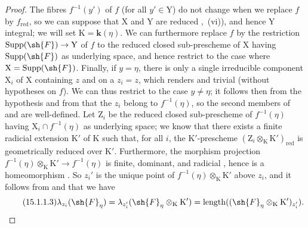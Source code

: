 \begin{proof}
\label{IV.15.1.1-proof}
The fibres $f^{-1}(y')$ of $f$ (for all $y'\in\mathrm{Y}$) do not change when we replace $f$ by $f_\mathrm{red}$, so we can suppose that $\mathrm{X}$ and $\mathrm{Y}$ are reduced ,~(vi)), and hence $\mathrm{Y}$ integral; we will set $\mathrm{K}=\mathbf{k}(\eta)$.
We can furthermore replace $f$ by the restriction $\operatorname{Supp}(\sh{F})\to\mathrm{Y}$ of $f$ to the reduced closed sub-prescheme of $\mathrm{X}$ having $\operatorname{Supp}(\sh{F})$ as underlying space, and hence restrict to the case where $\mathrm{X}=\operatorname{Supp}(\sh{F})$.
Finally, if $y=\eta$, there is only a single irreducible component $\mathrm{X}_i$ of $\mathrm{X}$ containing $z$  and on a $z_i=z$, which renders  and  trivial (without hypotheses on $f$).
We can thus restrict to the case $y\neq\eta$; it follows then from the hypothesis and from  that the $z_i$ belong to $f^{-1}(\eta)$, so the second members of  and  are well-defined.
Let $\mathrm{Z}_i$ be the reduced closed sub-prescheme of $f^{-1}(\eta)$ having $\mathrm{X}_i\cap f^{-1}(\eta)$ as underlying space; we know  that there exists a finite radicial extension $\mathrm{K}'$ of $\mathrm{K}$ such that, for all $i$, the $\mathrm{K}'$-prescheme $(\mathrm{Z}_i\otimes_\mathrm{K}\mathrm{K}')_\mathrm{red}$ is geometrically reduced over $\mathrm{K}'$.
Furthermore, the morphism projection $f^{-1}(\eta)\otimes_\mathrm{K}\mathrm{K}'\to f^{-1}(\eta)$ is finite, dominant, and radicial , hence is a homeomorphism .
So $z_i'$ is the unique point of $f^{-1}(\eta)\otimes_\mathrm{K}\mathrm{K}'$ above $z_i$, and it follows from  and  that we have
\[
\tag{15.1.1.3}
\label{IV.15.1.1.3}
  \lambda_{z_i}(\sh{F}_\eta)=\lambda_{z_i'}(\sh{F}_\eta\otimes_\mathrm{K}\mathrm{K}')=\operatorname{length}((\sh{F}_\eta\otimes_\mathrm{K}\mathrm{K}')_{z_i'}).
\]


\end{proof}
